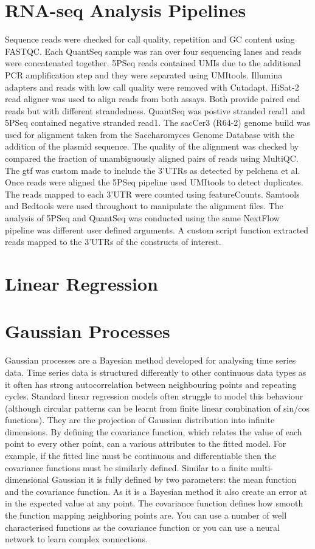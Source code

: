 \documentclass{SBCbookchapter}
\begin{document}
\section{RNA-seq Analysis Pipelines}

Sequence reads were checked for call quality, repetition and GC content using FASTQC. Each QuantSeq sample was ran over four sequencing lanes and reads were concatenated together. 5PSeq reads contained UMIs due to the additional PCR amplification step and they were separated using UMItools. Illumina adapters and reads with low call quality were removed with Cutadapt. HiSat-2 read aligner was used to align reads from both assays. Both provide paired end reads but with different strandedness. QuantSeq was postive stranded read1 and 5PSeq contained negative stranded read1. The sacCer3 (R64-2) genome build was used for alignment taken from the Saccharomyces Genome Database with the addition of the plasmid sequence. The quality of the alignment was checked by compared the fraction of unambiguously aligned pairs of reads using MultiQC. The gtf was custom made to include the 3'UTRs as detected by pelchena et al. Once reads were aligned the 5PSeq pipeline used UMItools to detect duplicates. The reads mapped to each 3'UTR were counted using featureCounts. Samtools and Bedtools were used throughout to manipulate the alignment files. The analysis of 5PSeq and QuantSeq was conducted using the same NextFlow pipeline was different user defined arguments. A custom script function extracted reads mapped to the 3'UTRs of the constructs of interest.

\section{Linear Regression}

\section{Gaussian Processes}
Gaussian processes are a Bayesian method developed for analysing time series data. Time series data is structured differently to other continuous data types as it often has strong autocorrelation between neighbouring points and repeating cycles. Standard linear regression models often struggle to model this behaviour (although circular patterns can be learnt from finite linear combination of sin/cos functions). They are the projection of Gaussian distribution into infinite dimensions. By defining the covariance function, which relates the value of each point to every other point, can a various attributes to the fitted model. For example, if the fitted line must be continuous and differentiable then the covariance functions must be similarly defined. Similar to a finite multi-dimensional Gaussian it is fully defined by two parameters:  the mean function and the covariance function. As it is a Bayesian method it also create an error at in the expected value at any point. The covariance function defines how smooth the function mapping neighboring points are. You can use a number of well characterised functions as the covariance function or you can use a neural network to learn complex connections. 
\end{document}
